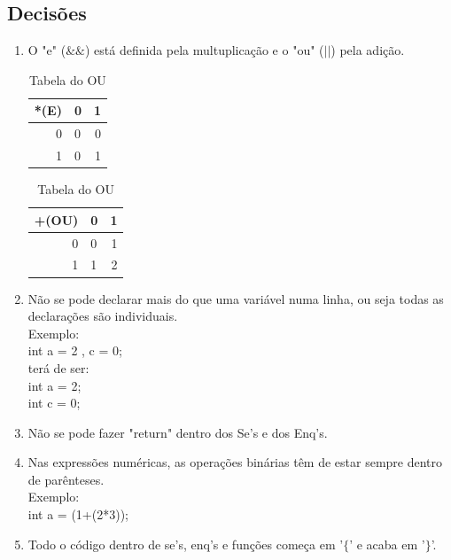 \documentclass{report}
\begin{document}
\subsection{Decisões}
\begin{enumerate}[1)]
	\item O "e" ($\&\&$) está definida pela multuplicação e o "ou" ($||$) pela adição.
 
	 \begin{table}[h]
		\begin{center}
	 	\caption{Tabela do E}
	 	\begin{tabular}{r|lr}
	 	 *(E)& 0 & 1\\ %
	 	\hline          %
	 	0 & 0 & 0 \\
	 	1 & 0 & 1\\
 	
		\end{tabular}
		\caption{Tabela do OU}
		\begin{tabular}{r|lr}
		+(OU)& 0 & 1\\ %
		\hline          %
		0 & 0 & 1 \\
		1 & 1 & 2\\
		\end{tabular}
		\end{center}
	\end{table}

	\item Não se pode declarar mais do que uma variável numa linha, ou seja todas as declarações são individuais.\\
	 Exemplo: \\int a = 2 , c = 0;\\ terá de ser:\\
	 int a = 2;\\
	 int c = 0;\\
	 \item Não se pode fazer "return" dentro dos Se's e dos Enq's.\\ 
	 \item Nas expressões numéricas, as operações binárias têm de estar sempre dentro de parênteses.\\
	 Exemplo:\\
	 int a = (1+(2*3));
	 \item Todo o código dentro de se's, enq's e funções começa em '$\{$' e acaba em  '$\}$'.
	 
	
\end{enumerate}
\end{document}
